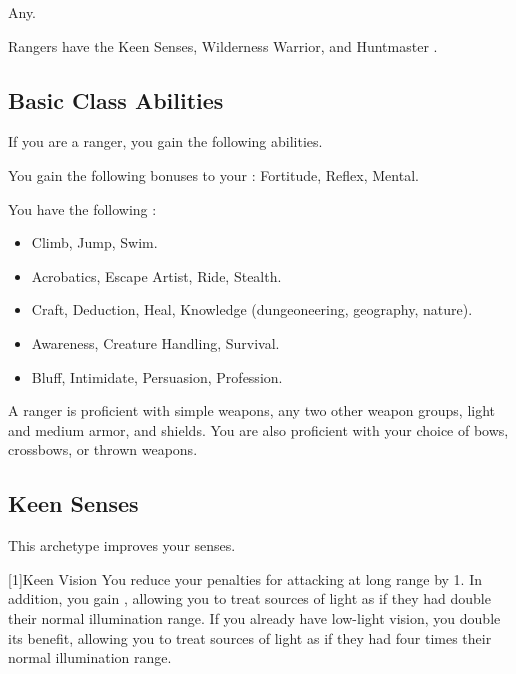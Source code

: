      Any.

     Rangers have the Keen Senses, Wilderness Warrior, and Huntmaster .

    \subsection{Basic Class Abilities}
        If you are a ranger, you gain the following abilities.

        You gain the following bonuses to your :  Fortitude,  Reflex,  Mental.

        You have the following :
        \begin{itemize}
            \item {} Climb, Jump, Swim.
            \item {} Acrobatics, Escape Artist, Ride, Stealth.
            \item {} Craft, Deduction, Heal, Knowledge (dungeoneering, geography, nature).
            \item {} Awareness, Creature Handling, Survival.
            \item {} Bluff, Intimidate, Persuasion, Profession.
        \end{itemize}

        A ranger is proficient with simple weapons, any two other weapon groups, light and medium armor, and shields.
        You are also proficient with your choice of bows, crossbows, or thrown weapons.

    \subsection{Keen Senses}
        This archetype improves your senses.

        [1]{Keen Vision}
        You reduce your  penalties for attacking at long range by 1.
        In addition, you gain , allowing you to treat sources of light as if they had double their normal illumination range.
        If you already have low-light vision, you double its benefit, allowing you to treat sources of light as if they had four times their normal illumination range.

